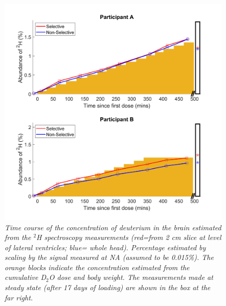 \begin{figure}[H]
    \centering
    \includegraphics[width=1\textwidth]{Figures/D2O/Bulk_Graph.png}
    \caption{\textit{Time course of the concentration of deuterium in the brain estimated from the $^2$H spectroscopy measurements (red=from 2 cm slice at level of lateral ventricles; blue= whole head). Percentage estimated by scaling by the signal measured at \ac{NA} (assumed to be 0.015\%). The orange blocks indicate the concentration estimated from the cumulative D$_2$O dose and body weight. The measurements made at steady state (after 17 days of loading) are shown in the box at the far right.}}
    \label{fig:D2O:Bulk}
\end{figure}

